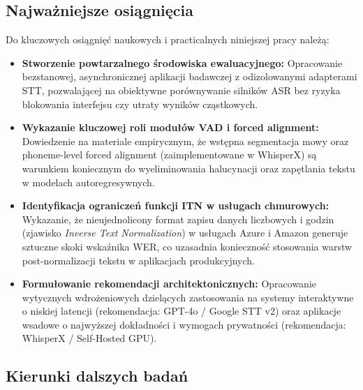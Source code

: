 \subsection*{Najważniejsze osiągnięcia}

Do kluczowych osiągnięć naukowych i practicalnych niniejszej pracy należą:
\begin{itemize}
    \item \textbf{Stworzenie powtarzalnego środowiska ewaluacyjnego:} Opracowanie bezstanowej, asynchronicznej aplikacji badawczej z odizolowanymi adapterami STT, pozwalającej na obiektywne porównywanie silników ASR bez ryzyka blokowania interfejsu czy utraty wyników cząstkowych.
    \item \textbf{Wykazanie kluczowej roli modułów VAD i forced alignment:} Dowiedzenie na materiale empirycznym, że wstępna segmentacja mowy oraz phoneme-level forced alignment (zaimplementowane w WhisperX) są warunkiem koniecznym do wyeliminowania halucynacji oraz zapętlania tekstu w modelach autoregresywnych.
    \item \textbf{Identyfikacja ograniczeń funkcji ITN w usługach chmurowych:} Wykazanie, że nieujednolicony format zapisu danych liczbowych i godzin (zjawisko \textit{Inverse Text Normalization}) w usługach Azure i Amazon generuje sztuczne skoki wskaźnika WER, co uzasadnia konieczność stosowania warstw post-normalizacji tekstu w aplikacjach produkcyjnych.
    \item \textbf{Formułowanie rekomendacji architektonicznych:} Opracowanie wytycznych wdrożeniowych dzielących zastosowania na systemy interaktywne o niskiej latencji (rekomendacja: GPT-4o / Google STT v2) oraz aplikacje wsadowe o najwyższej dokładności i wymogach prywatności (rekomendacja: WhisperX / Self-Hosted GPU).
\end{itemize}

\subsection*{Kierunki dalszych badań}

